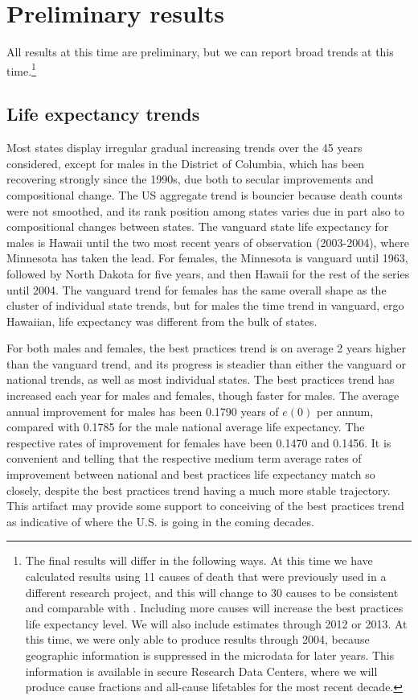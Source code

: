\documentclass[11pt,oneside,a4paper]{article} %
\begin{document}
\FloatBarrier
\section*{Preliminary results}
\FloatBarrier

All results at this time are preliminary, but we can report broad trends at this
time.\footnote{The final results will differ in the following ways. At this time we have
calculated results using 11 causes of death that were previously used in a different research project, and this will
change to 30 causes to be consistent and comparable with \citet{vallin2008minimum}. Including
more causes will increase the best practices life expectancy level. We will also
include estimates through 2012 or 2013. At this time, we were only able to
produce results through 2004, because geographic information is suppressed in
the microdata for later years. This information is available in secure Research
Data Centers, where we will produce cause fractions and all-cause lifetables for
the most recent decade.} 

\subsection*{Life expectancy trends}
Most states display irregular gradual increasing trends
over the 45 years considered, except for males in the District of Columbia,
which has been recovering strongly since the 1990s, due both to secular
improvements and compositional change. The US aggregate trend is bouncier
because death counts were not smoothed, and its rank position among states
varies due in part also to compositional changes between states. The vanguard
state life expectancy for males is Hawaii until the two most recent years of
observation (2003-2004), where Minnesota has taken the lead. For females, the
Minnesota is vanguard until 1963, followed by North Dakota for five years, and
then Hawaii for the rest of the series until 2004. The vanguard trend for
females has the same overall shape as the cluster of individual state trends,
but for males the time trend in vanguard, ergo Hawaiian, life expectancy was
different from the bulk of states. 

For both males and females, the best
practices trend is on average 2 years higher than the vanguard trend, and its
progress is steadier than either the vanguard or national trends, as well as
most individual states. The best practices trend has increased each year for
males and females, though faster for males. The average annual improvement for
males has been 0.1790 years of $e(0)$ per annum, compared with 0.1785 for the
male national average life expectancy. The respective rates of improvement for
females have been 0.1470 and 0.1456. It is convenient and telling that the
respective medium term average rates of improvement between national and
best practices life expectancy match so closely, despite the best practices
trend having a much more stable trajectory. This artifact may provide some
support to conceiving of the best practices trend as indicative of where the
U.S. is going in the coming decades.
\end{document}

